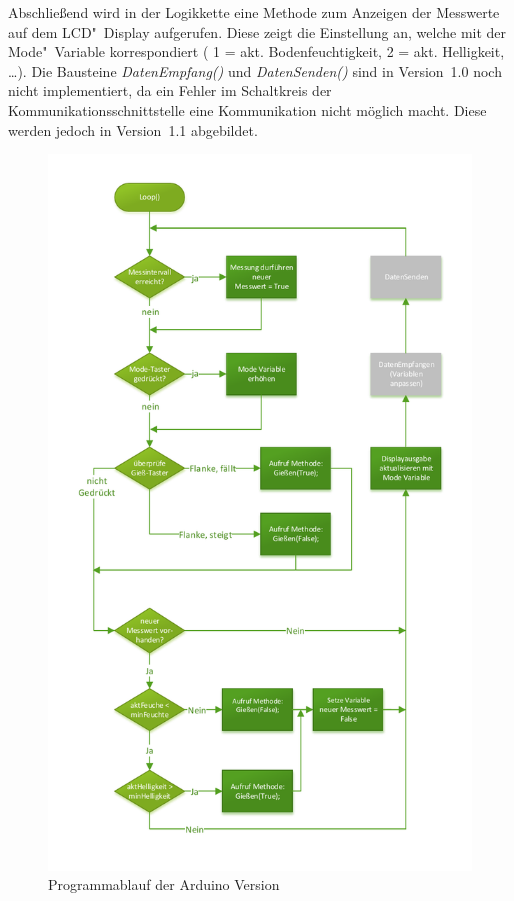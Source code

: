 Abschließend wird in der Logikkette eine Methode zum Anzeigen der Messwerte auf dem LCD"~Display aufgerufen. Diese zeigt die Einstellung an, welche mit der Mode"~Variable korrespondiert ( 1 = akt. Bodenfeuchtigkeit, 2 = akt.  Helligkeit, \dots). 
Die Bausteine \emph{DatenEmpfang()} und \emph{DatenSenden()} sind in Version~1.0 noch nicht implementiert, da ein Fehler im Schaltkreis der Kommunikationsschnittstelle eine Kommunikation nicht möglich macht. Diese werden jedoch in Version~1.1 abgebildet.

\begin{figure}[h]
	\centering
	\includegraphics[width=\linewidth]{diagramme/AV_Ablaufdiagramm.pdf}
	\caption{Programmablauf der Arduino Version}
	\label{fig-AV_Ablaufplan}
\end{figure}
	
